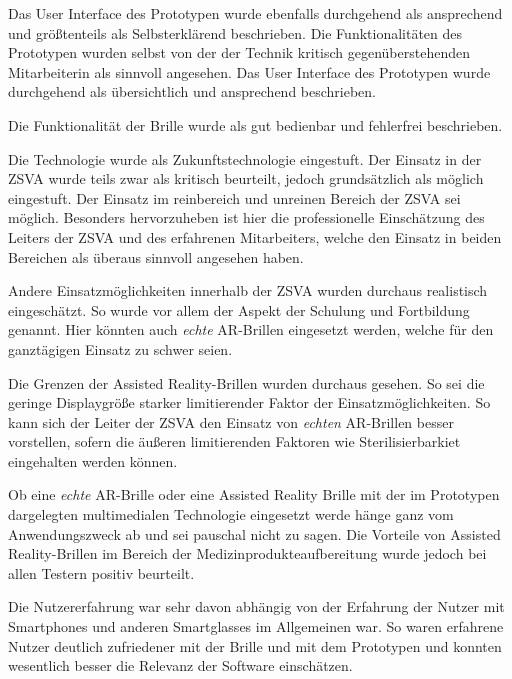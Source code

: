 Das User Interface des Prototypen wurde ebenfalls durchgehend als ansprechend und größtenteils als Selbsterklärend beschrieben. Die Funktionalitäten des Prototypen wurden selbst von der der Technik kritisch gegenüberstehenden Mitarbeiterin als sinnvoll angesehen. Das User Interface des Prototypen wurde durchgehend als übersichtlich und ansprechend beschrieben.

Die Funktionalität der Brille wurde als gut bedienbar und fehlerfrei beschrieben.

Die Technologie wurde als Zukunftstechnologie eingestuft. Der Einsatz in der ZSVA wurde teils zwar als kritisch beurteilt, jedoch grundsätzlich als möglich eingestuft. Der Einsatz im reinbereich und unreinen Bereich der ZSVA sei möglich. Besonders hervorzuheben ist hier die professionelle Einschätzung des Leiters der ZSVA und des erfahrenen Mitarbeiters, welche den Einsatz in beiden Bereichen als überaus sinnvoll angesehen haben.

Andere Einsatzmöglichkeiten innerhalb der ZSVA wurden durchaus realistisch eingeschätzt. So wurde vor allem der Aspekt der Schulung und Fortbildung genannt. Hier könnten auch \emph{echte} AR-Brillen eingesetzt werden, welche für den ganztägigen Einsatz zu schwer seien.

Die Grenzen der Assisted Reality-Brillen wurden durchaus gesehen. So sei die geringe Displaygröße starker limitierender Faktor der Einsatzmöglichkeiten. So kann sich der Leiter der ZSVA den Einsatz von \emph{echten} AR-Brillen besser vorstellen, sofern die äußeren limitierenden Faktoren wie Sterilisierbarkiet eingehalten werden können.

Ob eine \emph{echte} AR-Brille oder eine Assisted Reality Brille mit der im Prototypen dargelegten multimedialen Technologie eingesetzt werde hänge ganz vom Anwendungszweck ab und sei pauschal nicht zu sagen. Die Vorteile von Assisted Reality-Brillen im Bereich der Medizinprodukteaufbereitung wurde jedoch bei allen Testern positiv beurteilt.

Die Nutzererfahrung war sehr davon abhängig von der Erfahrung der Nutzer mit Smartphones und anderen Smartglasses im Allgemeinen war. So waren erfahrene Nutzer deutlich zufriedener mit der Brille und mit dem Prototypen und konnten wesentlich besser die Relevanz der Software einschätzen. 